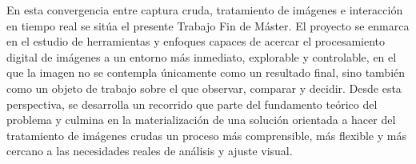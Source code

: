 En esta convergencia entre captura cruda, tratamiento de imágenes e interacción 
en tiempo real se sitúa el presente Trabajo Fin de Máster. El proyecto se enmarca 
en el estudio de herramientas y enfoques capaces de acercar el procesamiento digital 
de imágenes a un entorno más inmediato, explorable y controlable, en el que la imagen 
no se contempla únicamente como un resultado final, sino también como un objeto de 
trabajo sobre el que observar, comparar y decidir. Desde esta perspectiva, 
se desarrolla un recorrido que parte del fundamento teórico del problema y culmina 
en la materialización de una solución orientada a hacer del tratamiento de imágenes 
crudas un proceso más comprensible, más flexible y más cercano a las necesidades 
reales de análisis y ajuste visual.
